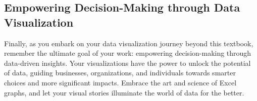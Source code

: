 \documentclass[
]{book}
\begin{document}
\hypertarget{empowering-decision-making-through-data-visualization}{%
\subsection{Empowering Decision-Making through Data Visualization}\label{empowering-decision-making-through-data-visualization}}

Finally, as you embark on your data visualization journey beyond this textbook, remember the ultimate goal of your work: empowering decision-making through data-driven insights. Your visualizations have the power to unlock the potential of data, guiding businesses, organizations, and individuals towards smarter choices and more significant impacts. Embrace the art and science of Excel graphs, and let your visual stories illuminate the world of data for the better.

  
\end{document}
